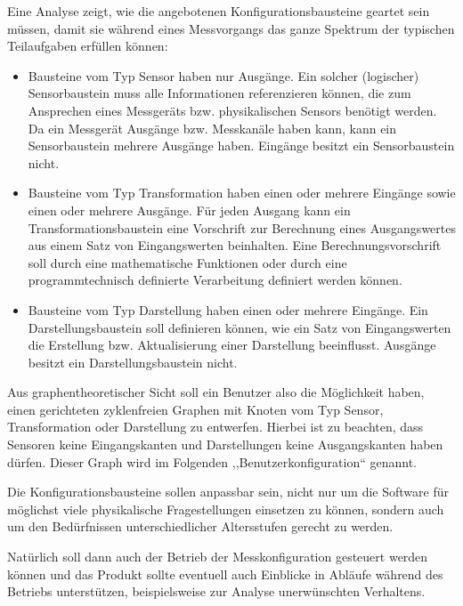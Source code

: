 \documentclass[parskip=full]{scrartcl}
\begin{document}
  Eine Analyse zeigt, wie die angebotenen Konfigurationsbausteine geartet sein müssen, damit sie während eines Messvorgangs das ganze Spektrum der typischen Teilaufgaben erfüllen können:

\begin{itemize}
	
	\item Bausteine vom Typ Sensor haben nur Ausgänge. Ein solcher (logischer) Sensorbaustein muss alle Informationen referenzieren können, die zum Ansprechen eines Messgeräts bzw. physikalischen Sensors benötigt werden. Da ein Messgerät Ausgänge bzw. Messkanäle haben kann, kann ein Sensorbaustein mehrere Ausgänge haben. Eingänge besitzt ein Sensorbaustein nicht. 
	
	\item Bausteine vom Typ Transformation haben einen oder mehrere Eingänge sowie einen oder mehrere Ausgänge. Für jeden Ausgang kann  ein Transformationsbaustein eine Vorschrift zur Berechnung eines Ausgangswertes aus einem Satz von Eingangswerten beinhalten. Eine Berechnungsvorschrift soll durch eine mathematische Funktionen oder durch eine programmtechnisch definierte Verarbeitung definiert werden können.
	
	\item Bausteine vom Typ Darstellung haben einen oder mehrere Eingänge. Ein Darstellungsbaustein soll definieren können, wie ein Satz von Eingangswerten die Erstellung bzw. Aktualisierung einer Darstellung beeinflusst. Ausgänge besitzt ein Darstellungsbaustein nicht. 
	
\end{itemize}

Aus graphentheoretischer Sicht soll ein Benutzer also die Möglichkeit haben, einen gerichteten zyklenfreien Graphen mit Knoten vom Typ Sensor, Transformation oder Darstellung zu entwerfen. Hierbei ist zu beachten, dass Sensoren keine Eingangskanten und Darstellungen keine Ausgangskanten haben dürfen. Dieser Graph wird im Folgenden ,,\gls{Benutzerkonfiguration}`` genannt.

Die Konfigurationsbausteine sollen anpassbar sein, nicht nur um die Software für möglichst viele physikalische Fragestellungen einsetzen zu können, sondern auch um den Bedürfnissen unterschiedlicher Altersstufen gerecht zu werden.

Natürlich soll dann auch der Betrieb der Messkonfiguration gesteuert werden können und das Produkt sollte eventuell auch Einblicke in Abläufe während des Betriebs unterstützen, beispielsweise zur Analyse unerwünschten Verhaltens.
\end{document}
